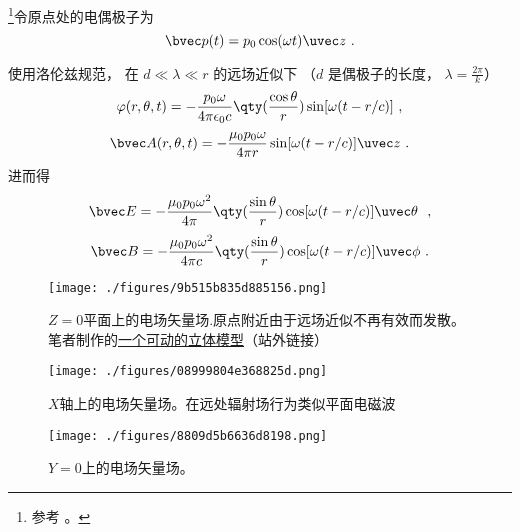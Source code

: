 
\begin{issues}
\issueDraft
\end{issues}


\footnote{参考 \cite{GriffE}。}令原点处的电偶极子为
\begin{equation}
\bvec p(t) = p_0 \cos(\omega t) \uvec z~.
\end{equation}

使用洛伦兹规范， 在 $d \ll \lambda \ll r$ 的远场近似下 （$d$ 是偶极子的长度， $\lambda = \frac{2\pi}{k}$）
\begin{equation}
\varphi(r, \theta, t) = -\frac{p_0\omega}{4\pi\epsilon_0 c} \qty(\frac{\cos\theta}{r}) \sin[\omega(t - r/c)]~,
\end{equation}
\begin{equation}
\bvec A(r, \theta, t) = -\frac{\mu_0 p_0 \omega}{4\pi r} \sin[\omega(t - r/c)]\uvec z~.
\end{equation}
进而得
\begin{equation}
\bvec E = -\frac{\mu_0 p_0\omega^2}{4\pi} \qty(\frac{\sin\theta}{r})\cos[\omega(t - r/c)]\uvec \theta~~,
\end{equation}
\begin{equation}
\bvec B = -\frac{\mu_0 p_0\omega^2}{4\pi c} \qty(\frac{\sin\theta}{r})\cos[\omega(t - r/c)]\uvec \phi~.
\end{equation}

\begin{figure}[ht]
\centering
\texttt{[image: ./figures/9b515b835d885156.png]}
\caption{$Z=0$平面上的电场矢量场.原点附近由于远场近似不再有效而发散。笔者制作的\href{https://www.geogebra.org/m/xnputtwr}{一个可动的立体模型}（站外链接）} \label{fig_DipRad_4}
\end{figure}

\begin{figure}[ht]
\centering
\texttt{[image: ./figures/08999804e368825d.png]}
\caption{$X$轴上的电场矢量场。在远处辐射场行为类似平面电磁波 } \label{fig_DipRad_1}
\end{figure}

\begin{figure}[ht]
\centering
\texttt{[image: ./figures/8809d5b6636d8198.png]}
\caption{$Y=0$上的电场矢量场。} \label{fig_DipRad_3}
\end{figure}
